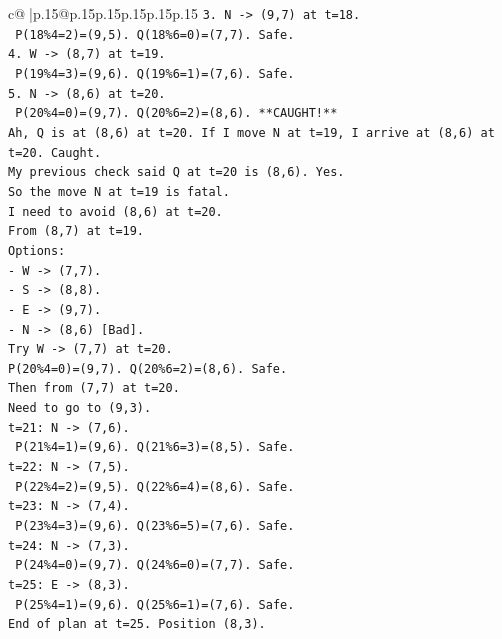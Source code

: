 \documentclass{article}
\begin{document}
{\begin{supertabular}{c@{$\;$}|p{.15\linewidth}@{}p{.15\linewidth}p{.15\linewidth}p{.15\linewidth}p{.15\linewidth}p{.15\linewidth}}
{{{\texttt{3. N {-}> (9,7) at t=18.} \\
\texttt{   P(18\%4=2)=(9,5). Q(18\%6=0)=(7,7). Safe.} \\
\texttt{4. W {-}> (8,7) at t=19.} \\
\texttt{   P(19\%4=3)=(9,6). Q(19\%6=1)=(7,6). Safe.} \\
\texttt{5. N {-}> (8,6) at t=20.} \\
\texttt{   P(20\%4=0)=(9,7). Q(20\%6=2)=(8,6). **CAUGHT!**} \\
\texttt{Ah, Q is at (8,6) at t=20. If I move N at t=19, I arrive at (8,6) at t=20. Caught.} \\
\texttt{My previous check said Q at t=20 is (8,6). Yes.} \\
\texttt{So the move N at t=19 is fatal.} \\
\texttt{I need to avoid (8,6) at t=20.} \\
\texttt{From (8,7) at t=19.} \\
\texttt{Options:} \\
\texttt{{-} W {-}> (7,7).} \\
\texttt{{-} S {-}> (8,8).} \\
\texttt{{-} E {-}> (9,7).} \\
\texttt{{-} N {-}> (8,6) {[}Bad{]}.} \\
\texttt{Try W {-}> (7,7) at t=20.} \\
\texttt{P(20\%4=0)=(9,7). Q(20\%6=2)=(8,6). Safe.} \\
\texttt{Then from (7,7) at t=20.} \\
\texttt{Need to go to (9,3).} \\
\texttt{t=21: N {-}> (7,6).} \\
\texttt{   P(21\%4=1)=(9,6). Q(21\%6=3)=(8,5). Safe.} \\
\texttt{t=22: N {-}> (7,5).} \\
\texttt{   P(22\%4=2)=(9,5). Q(22\%6=4)=(8,6). Safe.} \\
\texttt{t=23: N {-}> (7,4).} \\
\texttt{   P(23\%4=3)=(9,6). Q(23\%6=5)=(7,6). Safe.} \\
\texttt{t=24: N {-}> (7,3).} \\
\texttt{   P(24\%4=0)=(9,7). Q(24\%6=0)=(7,7). Safe.} \\
\texttt{t=25: E {-}> (8,3).} \\
\texttt{   P(25\%4=1)=(9,6). Q(25\%6=1)=(7,6). Safe.} \\
\texttt{End of plan at t=25. Position (8,3).} \\
}}}
\end{supertabular}}
\end{document}
